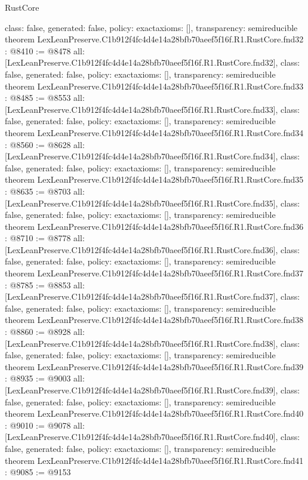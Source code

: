 \begin{lexlean}{RustCore}
\begin{coremodule}
{  class: false,
  generated: false,
  policy: exact{axioms: []},
  transparency: semireducible
}
theorem LexLeanPreserve.C1b912f4fc4d4e14a28bfb70aeef5f16f.R1.RustCore.fnd32 : @8410 := @8478 {
  all: [LexLeanPreserve.C1b912f4fc4d4e14a28bfb70aeef5f16f.R1.RustCore.fnd32],
  class: false,
  generated: false,
  policy: exact{axioms: []},
  transparency: semireducible
}
theorem LexLeanPreserve.C1b912f4fc4d4e14a28bfb70aeef5f16f.R1.RustCore.fnd33 : @8485 := @8553 {
  all: [LexLeanPreserve.C1b912f4fc4d4e14a28bfb70aeef5f16f.R1.RustCore.fnd33],
  class: false,
  generated: false,
  policy: exact{axioms: []},
  transparency: semireducible
}
theorem LexLeanPreserve.C1b912f4fc4d4e14a28bfb70aeef5f16f.R1.RustCore.fnd34 : @8560 := @8628 {
  all: [LexLeanPreserve.C1b912f4fc4d4e14a28bfb70aeef5f16f.R1.RustCore.fnd34],
  class: false,
  generated: false,
  policy: exact{axioms: []},
  transparency: semireducible
}
theorem LexLeanPreserve.C1b912f4fc4d4e14a28bfb70aeef5f16f.R1.RustCore.fnd35 : @8635 := @8703 {
  all: [LexLeanPreserve.C1b912f4fc4d4e14a28bfb70aeef5f16f.R1.RustCore.fnd35],
  class: false,
  generated: false,
  policy: exact{axioms: []},
  transparency: semireducible
}
theorem LexLeanPreserve.C1b912f4fc4d4e14a28bfb70aeef5f16f.R1.RustCore.fnd36 : @8710 := @8778 {
  all: [LexLeanPreserve.C1b912f4fc4d4e14a28bfb70aeef5f16f.R1.RustCore.fnd36],
  class: false,
  generated: false,
  policy: exact{axioms: []},
  transparency: semireducible
}
theorem LexLeanPreserve.C1b912f4fc4d4e14a28bfb70aeef5f16f.R1.RustCore.fnd37 : @8785 := @8853 {
  all: [LexLeanPreserve.C1b912f4fc4d4e14a28bfb70aeef5f16f.R1.RustCore.fnd37],
  class: false,
  generated: false,
  policy: exact{axioms: []},
  transparency: semireducible
}
theorem LexLeanPreserve.C1b912f4fc4d4e14a28bfb70aeef5f16f.R1.RustCore.fnd38 : @8860 := @8928 {
  all: [LexLeanPreserve.C1b912f4fc4d4e14a28bfb70aeef5f16f.R1.RustCore.fnd38],
  class: false,
  generated: false,
  policy: exact{axioms: []},
  transparency: semireducible
}
theorem LexLeanPreserve.C1b912f4fc4d4e14a28bfb70aeef5f16f.R1.RustCore.fnd39 : @8935 := @9003 {
  all: [LexLeanPreserve.C1b912f4fc4d4e14a28bfb70aeef5f16f.R1.RustCore.fnd39],
  class: false,
  generated: false,
  policy: exact{axioms: []},
  transparency: semireducible
}
theorem LexLeanPreserve.C1b912f4fc4d4e14a28bfb70aeef5f16f.R1.RustCore.fnd40 : @9010 := @9078 {
  all: [LexLeanPreserve.C1b912f4fc4d4e14a28bfb70aeef5f16f.R1.RustCore.fnd40],
  class: false,
  generated: false,
  policy: exact{axioms: []},
  transparency: semireducible
}
theorem LexLeanPreserve.C1b912f4fc4d4e14a28bfb70aeef5f16f.R1.RustCore.fnd41 : @9085 := @9153 {
}
\end{coremodule}
\end{lexlean}
